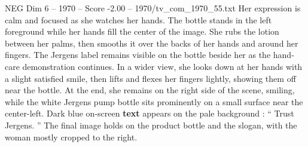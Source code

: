 \begin{textsample}{NEG Dim 6 – 1970 – Score -2.00 – 1970/tv\_com\_1970\_55.txt}
Her expression is calm and focused as she watches her hands.
The bottle stands in the left foreground while her hands fill the center of the image.
She rubs the lotion between her palms, then smooths it over the backs of her hands and around her fingers.
The Jergens label remains visible on the bottle beside her as the hand-care demonstration continues.
In a wider view, she looks down at her hands with a slight satisfied smile, then lifts and flexes her fingers lightly, showing them off near the bottle.
At the end, she remains on the right side of the scene, smiling, while the white Jergens pump bottle sits prominently on a small surface near the center-left.
Dark blue on-screen \textbf{text} appears on the pale background : “ Trust Jergens. ” The final image holds on the product bottle and the slogan, with the woman mostly cropped to the right.

\end{textsample}
